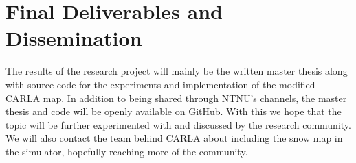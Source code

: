 \section*{Final Deliverables and Dissemination}
The results of the research project will mainly be the written master thesis along with source code for the experiments and implementation of the modified CARLA map. In addition to being shared through NTNU's channels, the master thesis and code will be openly available on GitHub. With this we hope that the topic will be further experimented with and discussed by the research community. We will also contact the team behind CARLA about including the snow map in the simulator, hopefully reaching more of the community.

\begin{comment}
C18: Explain how your results could be disseminated beyond your final master thesis.
\end{comment}